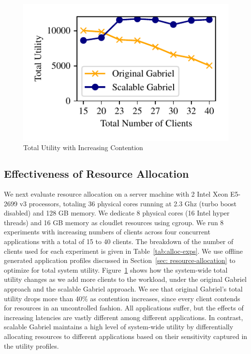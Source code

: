 \begin{figure}[]
  \centering
  \includegraphics[width=\linewidth]{FIGS/fig-alloc-max-util.pdf}
  \caption{Total Utility with Increasing Contention}
  \label{fig:alloc-max-util}
\end{figure}


\subsection{Effectiveness of Resource Allocation}

We next evaluate resource allocation on a server machine with 2
Intel{\textregistered} Xeon{\textregistered} E5-2699 v3 processors, totaling 36
physical cores running at 2.3 Ghz (turbo boost disabled) and 128 GB memory. We
dedicate 8 physical cores (16 Intel{\textregistered} hyper threads) and 16 GB memory as cloudlet
resources using cgroup. We run 8 experiments with increasing numbers of clients
across four concurrent applications with a total of 15 to 40 clients. The
breakdown of the number of clients used for each experiment is given in
Table~\ref{tab:alloc-exps}. We use offline generated application profiles
discussed in Section~\ref{sec: resource-allocation} to optimize for total system
utility. Figure~\ref{fig:alloc-max-util} shows how the system-wide total utility
changes as we add more clients to the workload, under the original Gabriel
approach and the scalable Gabriel approach. We see that original Gabriel's total
utility drops more than 40\% as contention increases, since every client
contends for resources in an uncontrolled fashion.  All applications suffer, but
the effects of increasing latencies are vastly different among different
applications. In contrast, scalable Gabriel maintains a high level of
system-wide utility by differentially allocating resources to different
applications based on their sensitivity captured in the utility profiles.

